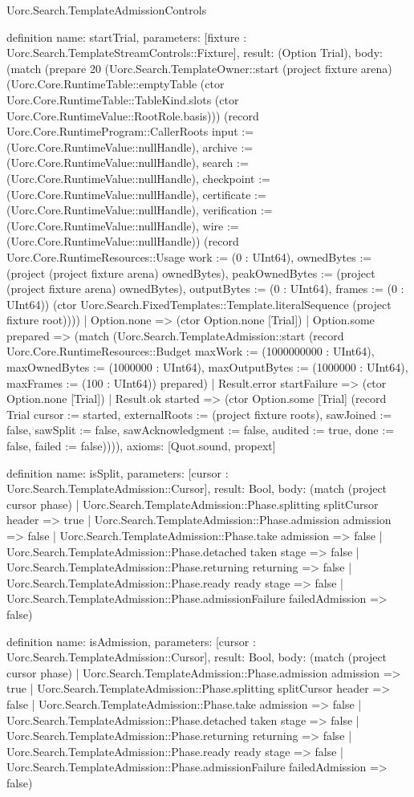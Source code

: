 \begin{lexlean}{Uorc.Search.TemplateAdmissionControls}
\begin{semanticmodule}
definition{
  name: startTrial,
  parameters: [fixture : Uorc.Search.TemplateStreamControls::Fixture],
  result: (Option Trial),
  body: (match (prepare 20 (Uorc.Search.TemplateOwner::start (project fixture arena) (Uorc.Core.RuntimeTable::emptyTable (ctor Uorc.Core.RuntimeTable::TableKind.slots (ctor Uorc.Core.RuntimeValue::RootRole.basis))) (record Uorc.Core.RuntimeProgram::CallerRoots {input := (Uorc.Core.RuntimeValue::nullHandle), archive := (Uorc.Core.RuntimeValue::nullHandle), search := (Uorc.Core.RuntimeValue::nullHandle), checkpoint := (Uorc.Core.RuntimeValue::nullHandle), certificate := (Uorc.Core.RuntimeValue::nullHandle), verification := (Uorc.Core.RuntimeValue::nullHandle), wire := (Uorc.Core.RuntimeValue::nullHandle)}) (record Uorc.Core.RuntimeResources::Usage {work := (0 : UInt64), ownedBytes := (project (project fixture arena) ownedBytes), peakOwnedBytes := (project (project fixture arena) ownedBytes), outputBytes := (0 : UInt64), frames := (0 : UInt64)}) (ctor Uorc.Search.FixedTemplates::Template.literalSequence (project fixture root))))
    | Option.none => (ctor Option.none [Trial])
    | Option.some prepared => (match (Uorc.Search.TemplateAdmission::start (record Uorc.Core.RuntimeResources::Budget {maxWork := (1000000000 : UInt64), maxOwnedBytes := (1000000 : UInt64), maxOutputBytes := (1000000 : UInt64), maxFrames := (100 : UInt64)}) prepared)
      | Result.error startFailure => (ctor Option.none [Trial])
      | Result.ok started => (ctor Option.some [Trial] (record Trial {cursor := started, externalRoots := (project fixture roots), sawJoined := false, sawSplit := false, sawAcknowledgment := false, audited := true, done := false, failed := false})))),
  axioms: [Quot.sound, propext]
}

definition{
  name: isSplit,
  parameters: [cursor : Uorc.Search.TemplateAdmission::Cursor],
  result: Bool,
  body: (match (project cursor phase)
    | Uorc.Search.TemplateAdmission::Phase.splitting splitCursor header => true
    | Uorc.Search.TemplateAdmission::Phase.admission admission => false
    | Uorc.Search.TemplateAdmission::Phase.take admission => false
    | Uorc.Search.TemplateAdmission::Phase.detached taken stage => false
    | Uorc.Search.TemplateAdmission::Phase.returning returning => false
    | Uorc.Search.TemplateAdmission::Phase.ready ready stage => false
    | Uorc.Search.TemplateAdmission::Phase.admissionFailure failedAdmission => false)
}

definition{
  name: isAdmission,
  parameters: [cursor : Uorc.Search.TemplateAdmission::Cursor],
  result: Bool,
  body: (match (project cursor phase)
    | Uorc.Search.TemplateAdmission::Phase.admission admission => true
    | Uorc.Search.TemplateAdmission::Phase.splitting splitCursor header => false
    | Uorc.Search.TemplateAdmission::Phase.take admission => false
    | Uorc.Search.TemplateAdmission::Phase.detached taken stage => false
    | Uorc.Search.TemplateAdmission::Phase.returning returning => false
    | Uorc.Search.TemplateAdmission::Phase.ready ready stage => false
    | Uorc.Search.TemplateAdmission::Phase.admissionFailure failedAdmission => false)
}


\end{semanticmodule}
\end{lexlean}
